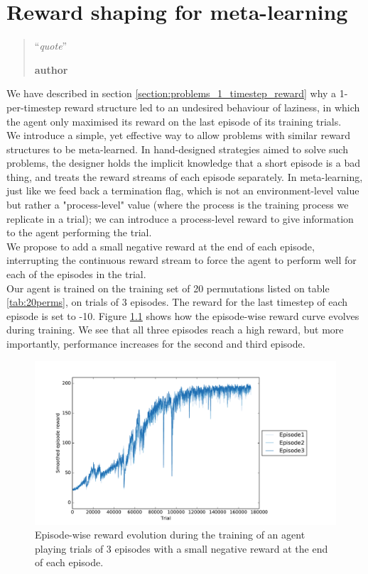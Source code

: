\chapter{Reward shaping for meta-learning}
\begin{quotation}
\noindent ``\emph{quote}''
\begin{flushright}\textbf{author}\end{flushright}
\end{quotation}


We have described in section \ref{section:problems_1_timestep_reward} why
a 1-per-timestep reward structure led to an undesired behaviour of laziness,
in which the agent only maximised its reward on the last episode of its
training trials.\\

We introduce a simple, yet effective way to allow problems with similar 
reward structures to be meta-learned. In hand-designed strategies aimed to
solve such problems, the designer holds the implicit knowledge that a short
episode is a bad thing, and treats the reward streams of each episode 
separately. In meta-learning, just like we feed back a termination flag, which
is not an environment-level value but rather a "process-level" value (where
the process is the training process we replicate in a trial); we can
introduce a process-level reward to give information to the agent 
performing the trial.\\

We propose to add a small negative reward at the end of each episode, 
interrupting the continuous reward stream to force the agent to perform
well for each of the episodes in the trial.\\

Our agent is trained on the training set of 20 permutations listed on table
\ref{tab:20perms}, on trials of 3 episodes. The reward for the last 
timestep of each episode is set to -10. Figure \ref{fig:magic} shows how
the episode-wise reward curve evolves during training. We see that all
three episodes reach a high reward, but more importantly, performance
increases for the second and third episode. \\

\begin{figure}
	\centering
	\includegraphics[width=0.8\linewidth]{fig/res_magic_neg10.pdf}
	\caption{Episode-wise reward evolution during the training of an
	agent playing trials of 3 episodes with a small negative reward
	at the end of each episode.}
	\label{fig:magic}
\end{figure}

